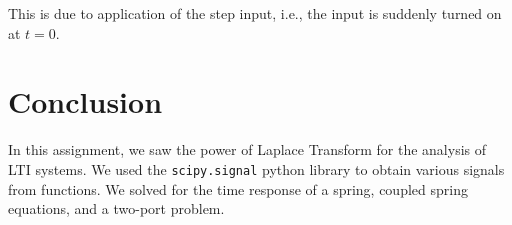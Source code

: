 \documentclass[11pt, a4paper]{article}
\begin{document}
    This is due to application of the step input, i.e., the input is suddenly turned on at $t=0$.
\section{Conclusion}
In this assignment, we saw the power of Laplace Transform for the analysis of LTI systems. We used the \texttt{scipy.signal} python library
to obtain various signals from functions. We solved for the time response of a spring, coupled spring equations, and a two-port problem.
\end{document}
